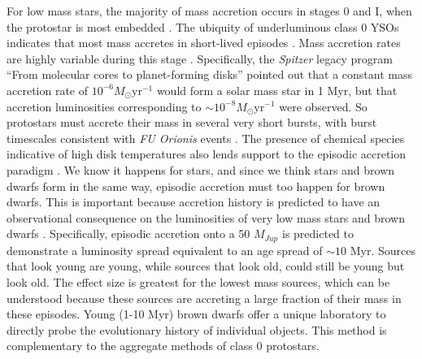 \documentclass[12pt,preprint]{aastex}
\begin{document}
For low mass stars, the majority of mass accretion occurs in stages 0 and I, when the protostar is most embedded \citep{2007ARA&A..45..565M,2014prpl.conf..195D}.  The ubiquity of underluminous class 0 YSOs indicates that most mass accretes in short-lived episodes \citep{2008ApJS..179..249D}.  Mass accretion rates are highly variable during this stage \citep{2006ApJ...650..956V,2009ApJ...702L..27B,2014prpl.conf..387A}.  Specifically, the \emph{Spitzer} legacy program ``From molecular cores to planet-forming disks'' \citep[][\emph{c2d}]{2009ApJS..181..321E} pointed out that a constant mass accretion rate of $10^{-6} M_{\odot}\mathrm{yr}^{-1}$ would form a solar mass star in 1 Myr, but that accretion luminosities corresponding to $\sim10^{-8} M_{\odot}\mathrm{yr}^{-1}$ were observed.  So protostars must accrete their mass in several very short bursts, with burst timescales consistent with \emph{FU Orionis} events \citep{2014prpl.conf..195D}.  The presence of chemical species indicative of high disk temperatures also lends support to the episodic accretion paradigm \citep{2012ApJ...754L..18V}.  We know it happens for stars, and since we think stars and brown dwarfs form in the same way, episodic accretion must too happen for brown dwarfs.  This is important because accretion history is predicted to have an observational consequence on the luminosities of very low mass stars and brown dwarfs \citep{2009ApJ...702L..27B, 2011ApJ...730...32S}.  Specifically, episodic accretion onto a 50 $M_{Jup}$ is predicted to demonstrate a luminosity spread equivalent to an age spread of $\sim10$ Myr.  Sources that look young are young, while sources that look old, could still be young but look old.  The effect size is greatest for the lowest mass sources, which can be understood because these sources are accreting a large fraction of their mass in these episodes.  Young (1-10 Myr) brown dwarfs offer a unique laboratory to directly probe the evolutionary history of individual objects.  This method is complementary to the aggregate methods of class 0 protostars.  
\end{document}
